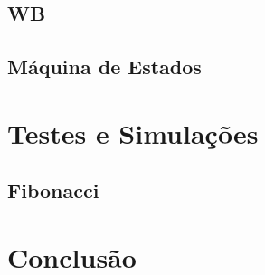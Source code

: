\documentclass[a4paper]{article}
\begin{document}
		\subsection{WB}
		
		\subsection{Máquina de Estados}
		
	\section{Testes e Simulações}
	
		\subsection{Fibonacci}
		
	\section{Conclusão}
	
\end{document}
